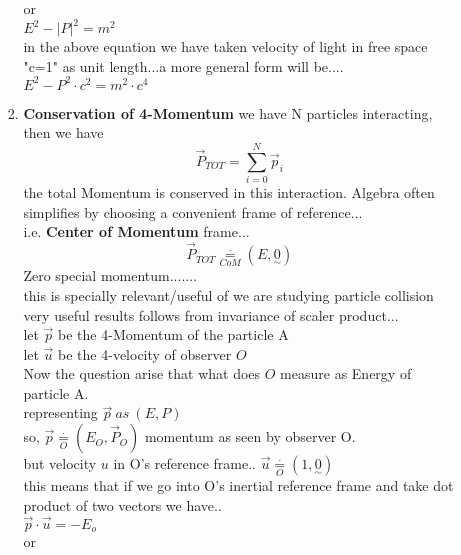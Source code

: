 \documentclass[11pt,a4paper]{article}
\begin{document}
\begin{enumerate}
\begin{enumerate}
\begin{enumerate}
			                  or \\
			                  $E^2 - \lvert P \rvert^2 = m^2$\\
			                  in the above equation we have taken velocity of light in free space "c=1" as unit length...a more general form will be....\\
			                  $E^2 -  P^2 \cdot c^2= m^2\cdot c^4$\\
			            \item \textbf{Conservation of 4-Momentum}\newline
			                  we have N particles interacting, then we have
			                  \[\vec{P}_{TOT}= \sum_{i=0}^{N}\vec{p}_{i}\]
			                  the total Momentum is conserved in this interaction.
			                  Algebra often simplifies by choosing a convenient frame of reference...\\
			                  i.e. \textbf{Center of Momentum} frame...\\
			                  \[\vec{P}_{TOT} \mathop = \limits^{\cdot}_{CoM} (E,\underset{\sim}{0})\]
			                  Zero special momentum.......\\
			                  this is specially relevant/useful of we are studying particle collision\\
			                  very useful results follows from invariance of scaler product...\\
			                  let $\vec{p}$ be the 4-Momentum of the particle A\\
			                  let $\vec{u}$ be the 4-velocity of observer $O$\\
			                  Now the question arise that what does $O$ measure as Energy of particle A.\\
			                  representing $\vec{p}\ as \ (E,P)$\\
			                  so, $\vec{p} \mathop = \limits^{\cdot}_{O} (E_{O},\vec{P}_{O})$ momentum as seen by observer O.\\
			                  but velocity $u$ in O's reference frame..
			                  $\vec{u}\mathop = \limits^{\cdot}_{O}(1,\underset{\sim}{0})$\\
			                  this means that if we go into O's inertial reference frame and take dot product of two vectors we have..\\
			                  $\vec{p}\cdot\vec{u} = - E_o$\\
			                  or\\

\end{enumerate}
\end{enumerate}
\end{enumerate}
\end{document}
